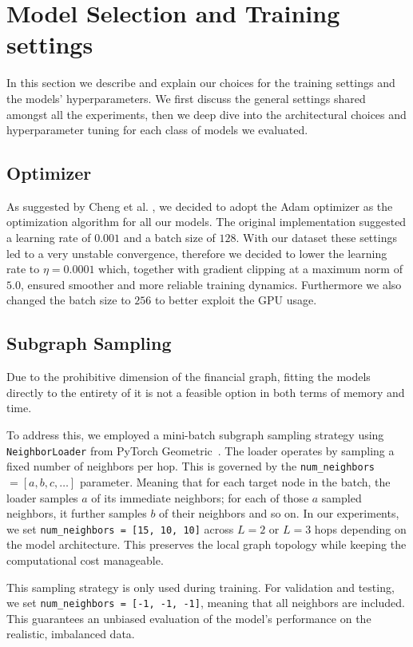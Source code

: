 \section{Model Selection and Training settings}
In this section we describe and explain our choices for the training settings and the models' hyperparameters. We first discuss the general settings shared amongst all the experiments, then we deep dive into the architectural choices and hyperparameter tuning for each class of models we evaluated. 

\subsection{Optimizer}
As suggested by Cheng et al. \cite{mainpaper}, we decided to adopt the Adam optimizer \cite{adam} as the optimization algorithm for all our models. The original implementation suggested a learning rate of \(0.001\) and a batch size of \(128\). 
With our dataset these settings led to a very unstable convergence, therefore we decided to lower the learning rate to \(\eta = 0.0001\) which, together with gradient clipping at a maximum norm of \(5.0\), ensured smoother and more reliable training dynamics. Furthermore we also changed the batch size to \(256\) to better exploit the GPU usage.

\subsection{Subgraph Sampling}
Due to the prohibitive dimension of the financial graph, fitting the models directly to the entirety of it is not a feasible option in both terms of memory and time.

To address this, we employed a mini-batch subgraph sampling strategy using \texttt{NeighborLoader} from PyTorch Geometric~\cite{pyg}.
The loader operates by sampling a fixed number of neighbors per hop. This is governed by the \texttt{num\_neighbors} \(=[a,b,c,\dots]\) parameter. Meaning that for each target node in the batch, the loader samples $a$ of its immediate neighbors; for each of those \(a\) sampled neighbors, it further samples $b$ of their neighbors and so on. 
In our experiments, we set \texttt{num\_neighbors = [15, 10, 10]} across $L = 2$ or \(L=3\) hops depending on the model architecture. This preserves the local graph topology while keeping the computational cost manageable.

This sampling strategy is only used during {training}. For validation and {testing}, we set \texttt{num\_neighbors = [-1, -1, -1]}, meaning that all neighbors are included. This guarantees an unbiased evaluation of the model's performance on the realistic, imbalanced data.


